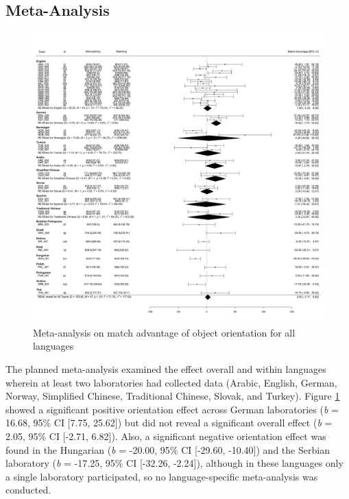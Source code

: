 \documentclass[
  man,floatsintext]{apa7}
\begin{document}
\hypertarget{meta-analysis}{%
\subsection{Meta-Analysis}\label{meta-analysis}}

\begin{figure}
\includegraphics[width=14in]{includes/fig/meta-all} \caption{Meta-analysis on match advantage of object orientation for all languages}\label{fig:meta-all-plot}
\end{figure}

The planned meta-analysis examined the effect overall and within
languages wherein at least two laboratories had collected data (Arabic,
English, German, Norway, Simplified Chinese, Traditional Chinese,
Slovak, and Turkey). Figure \ref{fig:meta-all-plot} showed a
significant positive orientation effect across German laboratories (\emph{b}
= 16.68, 95\% CI
{[}7.75,
25.62{]}) but did not reveal a
significant overall effect (\emph{b} =
2.05, 95\% CI
{[}-2.71,
6.82{]}). Also, a significant
negative orientation effect was found in the Hungarian (\emph{b} = -20.00,
95\% CI {[}-29.60, -10.40{]}) and the Serbian laboratory (\emph{b} = -17.25, 95\%
CI {[}-32.26, -2.24{]}), although in these languages only a single
laboratory participated, so no language-specific meta-analysis was
conducted.
\end{document}
